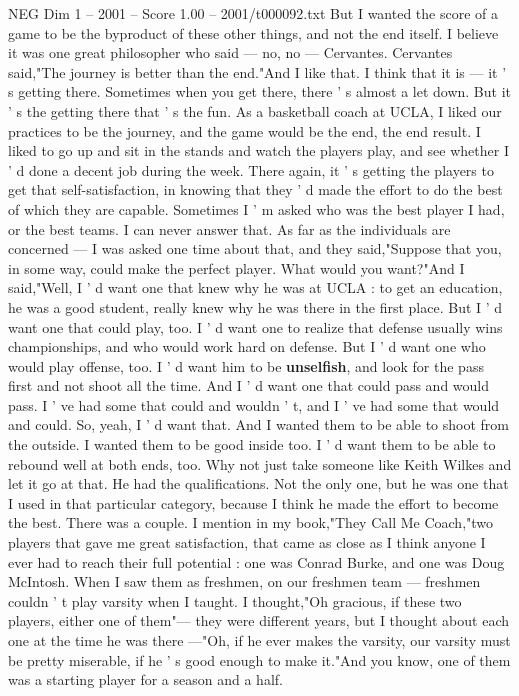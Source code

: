 \begin{textsample}{NEG Dim 1 – 2001 – Score 1.00 – 2001/t000092.txt}
But I wanted the score of a game to be the byproduct of these other things, and not the end itself.
I believe it was one great philosopher who said — no, no — Cervantes.
Cervantes said,"The journey is better than the end."And I like that.
I think that it is — it ' s getting there.
Sometimes when you get there, there ' s almost a let down.
But it ' s the getting there that ' s the fun.
As a basketball coach at UCLA, I liked our practices to be the journey, and the game would be the end, the end result.
I liked to go up and sit in the stands and watch the players play, and see whether I ' d done a decent job during the week.
There again, it ' s getting the players to get that self-satisfaction, in knowing that they ' d made the effort to do the best of which they are capable.
Sometimes I ' m asked who was the best player I had, or the best teams.
I can never answer that.
As far as the individuals are concerned — I was asked one time about that, and they said,"Suppose that you, in some way, could make the perfect player.
What would you want?"And I said,"Well, I ' d want one that knew why he was at UCLA : to get an education, he was a good student, really knew why he was there in the first place.
But I ' d want one that could play, too.
I ' d want one to realize that defense usually wins championships, and who would work hard on defense.
But I ' d want one who would play offense, too.
I ' d want him to be \textbf{unselfish}, and look for the pass first and not shoot all the time.
And I ' d want one that could pass and would pass.
I ' ve had some that could and wouldn ' t, and I ' ve had some that would and could.
So, yeah, I ' d want that.
And I wanted them to be able to shoot from the outside.
I wanted them to be good inside too.
I ' d want them to be able to rebound well at both ends, too.
Why not just take someone like Keith Wilkes and let it go at that.
He had the qualifications.
Not the only one, but he was one that I used in that particular category, because I think he made the effort to become the best.
There was a couple.
I mention in my book,"They Call Me Coach,"two players that gave me great satisfaction, that came as close as I think anyone I ever had to reach their full potential : one was Conrad Burke, and one was Doug McIntosh.
When I saw them as freshmen, on our freshmen team — freshmen couldn ' t play varsity when I taught.
I thought,"Oh gracious, if these two players, either one of them"— they were different years, but I thought about each one at the time he was there —"Oh, if he ever makes the varsity, our varsity must be pretty miserable, if he ' s good enough to make it."And you know, one of them was a starting player for a season and a half.

\end{textsample}
